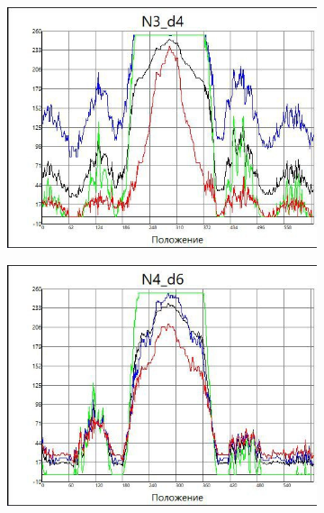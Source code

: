 \begin{figure}[h]
\begin{subfigure}{.5\textwidth}
        \centering
        \includegraphics[trim={0 0 0 0},clip,width=\textwidth]{Ex_1/n3.jpg}
        \caption{}
        \label{n3}
    \end{subfigure}
    \begin{subfigure}{.5\textwidth}
        \centering
        \includegraphics[trim={0 0 0 0},clip,width=\textwidth]{Ex_1/n4.jpg}
        \caption{}
        \label{n4}
    \end{subfigure}
\end{figure}

